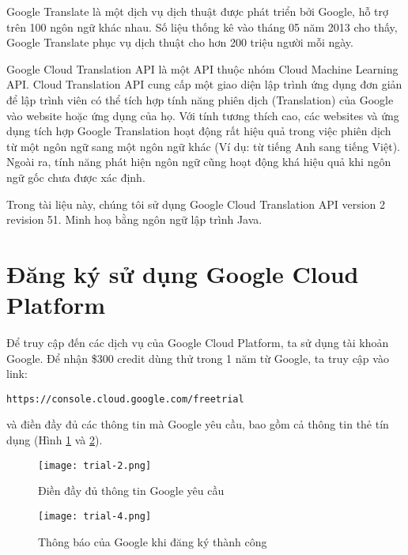 \documentclass[../thesis.tex]{subfiles}
\begin{document}

Google Translate là một dịch vụ dịch thuật được phát triển bởi Google, hỗ trợ trên 100 ngôn ngữ khác nhau. Số liệu thống kê vào tháng 05 năm 2013 cho thấy, Google Translate phục vụ dịch thuật cho hơn 200 triệu người mỗi ngày.

Google Cloud Translation API là một API thuộc nhóm Cloud Machine Learning API. Cloud Translation API cung cấp một giao diện lập trình ứng dụng đơn giản để lập trình viên có thể tích hợp tính năng phiên dịch (Translation) của Google vào website hoặc ứng dụng của họ. Với tính tương thích cao, các websites và ứng dụng tích hợp Google Translation hoạt động rất hiệu quả trong việc phiên dịch từ một ngôn ngữ sang một ngôn ngữ khác (Ví dụ: từ tiếng Anh sang tiếng Việt). Ngoài ra, tính năng phát hiện ngôn ngữ cũng hoạt động khá hiệu quả khi ngôn ngữ gốc chưa được xác định.

Trong tài liệu này, chúng tôi sử dụng Google Cloud Translation API version 2 revision 51. Minh hoạ bằng ngôn ngữ lập trình Java. 

\section{Đăng ký sử dụng Google Cloud Platform}

Để truy cập đến các dịch vụ của Google Cloud Platform, ta sử dụng tài khoản Google. Để nhận \$300 credit dùng thử trong 1 năm từ Google, ta truy cập vào link:
\begin{lstlisting}[style=link]
https://console.cloud.google.com/freetrial
\end{lstlisting}
và điền đầy đủ các thông tin mà Google yêu cầu, bao gồm cả thông tin thẻ tín dụng (Hình \ref{Dien day du thong tin ma Google yeu cau} và \ref{Thong bao cua Google khi dang ky thanh cong}).

\begin{figure}
	\texttt{[image: trial-2.png]}
	\caption{Điền đầy đủ thông tin Google yêu cầu}
	\label{Dien day du thong tin ma Google yeu cau}
\end{figure}

\begin{figure}
	\texttt{[image: trial-4.png]}
	\caption{Thông báo của Google khi đăng ký thành công}
	\label{Thong bao cua Google khi dang ky thanh cong}
\end{figure}
\end{document}
